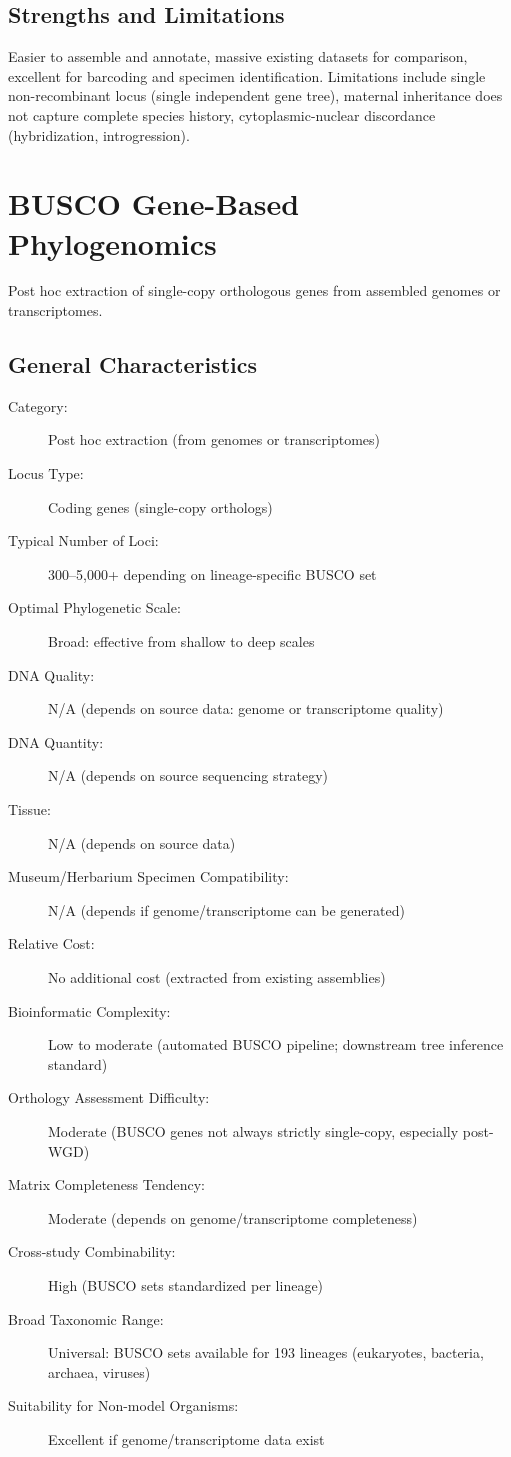 \subsection{Strengths and Limitations}

Easier to assemble and annotate, massive existing datasets for comparison, excellent for barcoding and specimen identification. Limitations include single non-recombinant locus (single independent gene tree), maternal inheritance does not capture complete species history, cytoplasmic-nuclear discordance (hybridization, introgression).

\textcite{jansen2007, smith2015, twyford2017, li2021}

\section{BUSCO Gene-Based Phylogenomics}

Post hoc extraction of single-copy orthologous genes from assembled genomes or transcriptomes.

\subsection{General Characteristics}

\begin{description}
\item[Category:] Post hoc extraction (from genomes or transcriptomes)
\item[Locus Type:] Coding genes (single-copy orthologs)
\item[Typical Number of Loci:] 300--5,000+ depending on lineage-specific BUSCO set
\item[Optimal Phylogenetic Scale:] Broad: effective from shallow to deep scales
\item[DNA Quality:] N/A (depends on source data: genome or transcriptome quality)
\item[DNA Quantity:] N/A (depends on source sequencing strategy)
\item[Tissue:] N/A (depends on source data)
\item[Museum/Herbarium Specimen Compatibility:] N/A (depends if genome/transcriptome can be generated)
\item[Relative Cost:] No additional cost (extracted from existing assemblies)
\item[Bioinformatic Complexity:] Low to moderate (automated BUSCO pipeline; downstream tree inference standard)
\item[Orthology Assessment Difficulty:] Moderate (BUSCO genes not always strictly single-copy, especially post-WGD)
\item[Matrix Completeness Tendency:] Moderate (depends on genome/transcriptome completeness)
\item[Cross-study Combinability:] High (BUSCO sets standardized per lineage)
\item[Broad Taxonomic Range:] Universal: BUSCO sets available for 193 lineages (eukaryotes, bacteria, archaea, viruses)
\item[Suitability for Non-model Organisms:] Excellent if genome/transcriptome data exist
\end{description}

